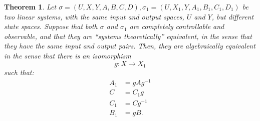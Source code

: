 \documentclass[12pt]{book}
\theoremstyle{plain}
\newtheorem{theorem}{Theorem}[section]
\theoremstyle{definition}
\begin{document}
\begin{theorem} \label{thm:Equivalence3}
    Let $\sigma = (U, X, Y, A, B, C, D), \sigma_1 = (U, X_1, Y, A_1, B_1, C_1, D_1)$ be two linear systems, with the same input and output spaces, $U$ and $Y$, but different state spaces.
    Suppose that both $\sigma$ and $\sigma_1$ are completely controllable and observable, and that they are ``systems theoretically'' equivalent, in the sense that they have the same input and output pairs.
    Then, they are algebraically equivalent in the sense that there is an isomorphism
    $$g: X \to X_1$$
    such that:
    \begin{align}
        A_1 &= gAg^{-1} \\
        C &= C_1g \\
        C_1 &= Cg^{-1} \\
        B_1 &= gB.
    \end{align}
\end{theorem}
\end{document}
